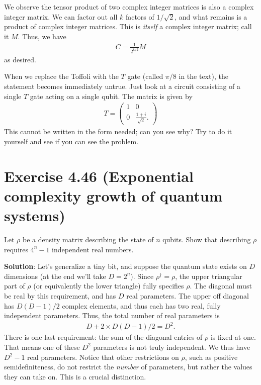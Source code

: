 \documentclass{book}
\begin{document}
    We observe the tensor product of two complex integer matrices is also a complex integer matrix. We can factor out all $k$ factors of $1/\sqrt{2}$, and what remains is a product of complex integer matrices. This is \emph{itself} a complex integer matrix; call it $M$. Thus, we have
    \begin{align}
        C = \frac{1}{2^{k/2}} M
    \end{align}
    as desired.

    When we replace the Toffoli with the $T$ gate (called $\pi/8$ in the text), the statement becomes immediately untrue. Just look at a circuit consisting of a single $T$ gate acting on a single qubit. The matrix is given by
    \begin{align}
        T = \begin{pmatrix}
            1 & 0 \\
            0 & \frac{1 + i}{\sqrt{2}}.
        \end{pmatrix}
    \end{align}
    This cannot be written in the form needed; can you see why? Try to do it yourself and see if you can see the problem.

\section*{Exercise 4.46 (Exponential complexity growth of quantum systems)}
    Let $\rho$ be a density matrix describing the state of $n$ qubits. Show that describing $\rho$ requires $4^n -1$ independent real numbers. 

    \textbf{Solution}: Let's generalize a tiny bit, and suppose the quantum state exists on $D$ dimensions (at the end we'll take $D = 2^n$). Since $\rho^\dagger = \rho$, the upper triangular part of $\rho$ (or equivalently the lower triangle) fully specifies $\rho$. The diagonal must be real by this requirement, and has $D$ real parameters. The upper off diagonal has $D(D-1)/2$ complex elements, and thus each has two real, fully independent parameters. Thus, the total number of real parameters is
    \begin{align}
        D + 2 \times D(D-1)/2 = D^2.
    \end{align}
    There is one last requirement: the sum of the diagonal entries of $\rho$ is fixed at one. That means one of these $D^2$ parameters is not truly independent. We thus have $D^2 - 1$ real parameters. Notice that other restrictions on $\rho$, such as positive semidefiniteness, do not restrict the \emph{number} of parameters, but rather the values they can take on. This is a crucial distinction.
\end{document}
